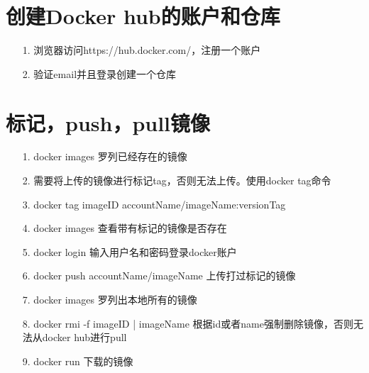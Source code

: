 \documentclass[a4paper,left=1.5cm,right=1.5cm,11pt]{article}
\begin{document}
\section{创建Docker hub的账户和仓库}
\begin{itemize}
	\item[1.]浏览器访问https://hub.docker.com/，注册一个账户
	\item[2.]验证email并且登录创建一个仓库
\end{itemize}

\section{标记，push，pull镜像}
\begin{itemize}
	\item[1.]docker images 罗列已经存在的镜像
	\item[2.]需要将上传的镜像进行标记tag，否则无法上传。使用docker tag命令
	\item[3.]docker tag imageID accountName/imageName:versionTag
	\item[4.]docker images 查看带有标记的镜像是否存在
	\item[5.]docker login  输入用户名和密码登录docker账户
	\item[6.]docker push accountName/imageName 上传打过标记的镜像
	\item[7.]docker images 罗列出本地所有的镜像
	\item[8.]docker rmi -f imageID | imageName 根据id或者name强制删除镜像，否则无法从docker hub进行pull
	\item[9.]docker run 下载的镜像
\end{itemize}
\end{document}
